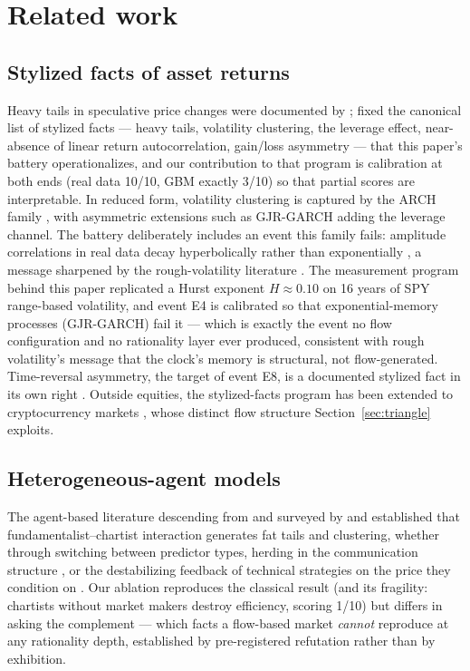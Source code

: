 \documentclass[11pt]{article}
\begin{document}
\section{Related work}
\label{sec:related}

\subsection{Stylized facts of asset returns}
\label{sec:related:facts}

Heavy tails in speculative price changes were documented by
\citet{mandelbrot1963}; \citet{cont2001} fixed the canonical list of
stylized facts --- heavy tails, volatility clustering, the leverage effect,
near-absence of linear return autocorrelation, gain/loss asymmetry --- that
this paper's battery operationalizes, and our contribution to that program
is calibration at both ends (real data 10/10, GBM exactly 3/10) so that
partial scores are interpretable. In reduced form, volatility clustering is
captured by the ARCH family \citep{engle1982, bollerslev1986}, with
asymmetric extensions such as GJR-GARCH \citep{glosten1993} adding the
leverage channel. The battery deliberately includes an event this family
fails: amplitude correlations in real data decay hyperbolically rather than
exponentially \citep{ding1993}, a message sharpened by the rough-volatility
literature \citep{gatheral2018}. The measurement program behind this paper
replicated a Hurst exponent $H \approx 0.10$ on 16
years of SPY range-based volatility, and event E4 is calibrated so that
exponential-memory processes (GJR-GARCH) fail it --- which is exactly the
event no flow configuration and no rationality layer ever produced, consistent
with rough volatility's message that the clock's memory is structural, not
flow-generated.
Time-reversal asymmetry, the target of event E8, is a documented stylized
fact in its own right \citep{zumbach2009}. Outside equities, the
stylized-facts program has been extended to cryptocurrency markets
\citep{urquhart2016, zhang2018}, whose distinct flow structure
Section~\ref{sec:triangle} exploits.

\subsection{Heterogeneous-agent models}
\label{sec:related:ham}

The agent-based literature descending from \citet{lux1999} and surveyed by
\citet{lebaron2000, lebaron2006} and \citet{hommes2006} established that
fundamentalist--chartist interaction
generates fat tails and clustering, whether through switching between predictor
types, herding in the communication structure \citep{cont2000}, or the
destabilizing feedback of technical strategies on the price they condition
on \citep{farmer2002, chiarella2009}. Our ablation reproduces the classical
result (and its
fragility: chartists without market makers destroy efficiency, scoring 1/10)
but differs in asking the complement --- which facts a flow-based market
\emph{cannot} reproduce at any rationality depth, established by pre-registered
refutation rather than by exhibition.
\end{document}
